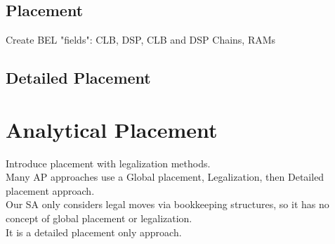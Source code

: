 \documentclass[twocolumn]{article}
\begin{document}
    \subsection{Placement}
        Create BEL "fields": CLB, DSP, CLB and DSP Chains, RAMs

        \subsection{Detailed Placement}







\section{Analytical Placement}
    Introduce placement with legalization methods. \\
    Many AP approaches use a Global placement, Legalization, then Detailed placement approach. \\
    Our SA only considers legal moves via bookkeeping structures, so it has no concept of global placement or legalization. \\
    It is a detailed placement only approach. \\
\end{document}
